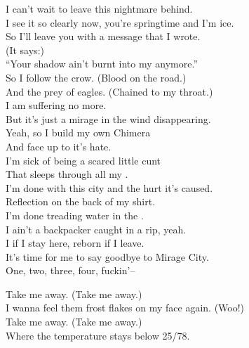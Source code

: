 
I can't wait to leave this nightmare behind. \\
I see it so clearly now, you're springtime and I'm ice. \\
So I'll leave you with a message that I wrote. \\
(It says:) \\
``Your shadow ain't burnt into my  anymore.'' \\

So I follow the crow. (Blood on the road.) \\
And the prey of eagles. (Chained to my throat.) \\
I am suffering no more. \\
But it's just a mirage in the wind disappearing. \\

Yeah, so I build my own Chimera \\
And face up to it's hate. \\
I'm sick of being a scared little cunt \\
That sleeps through all my . \\
I'm done with this city and the hurt it's caused. \\

Reflection on the back of my shirt. \\
I'm done treading water in the . \\
I ain't a backpacker caught in a rip, yeah. \\
I  if I stay here, reborn if I leave. \\
It's time for me to say goodbye to Mirage City. \\

One, two, three, four, fuckin'--




Take me away. (Take me away.) \\
I wanna feel them frost flakes on my face again. (Woo!) \\
Take me away. (Take me away.) \\
Where the temperature stays below 25/78. \\


